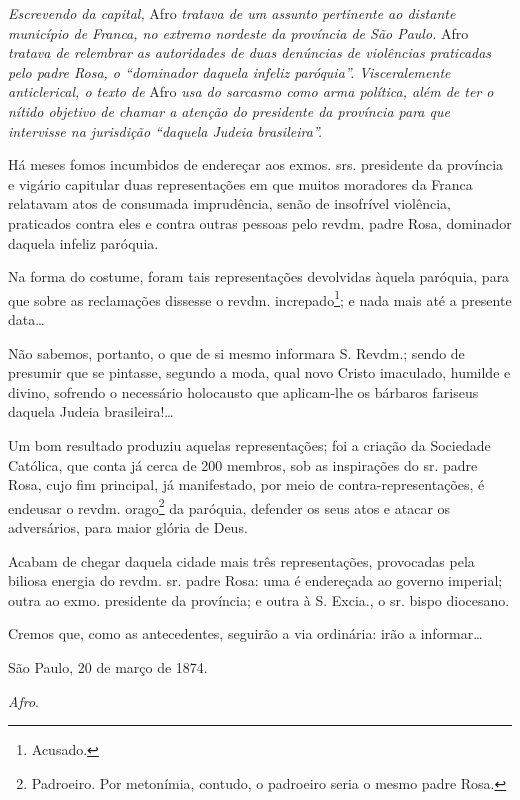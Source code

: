 \begin{didascalia}
\emph{Escrevendo da capital,} Afro \emph{tratava de um assunto
pertinente ao distante município de Franca, no extremo nordeste da
província de São Paulo.} Afro \emph{tratava de relembrar as autoridades
de duas denúncias de violências praticadas pelo padre Rosa, o ``dominador
daquela infeliz paróquia''. Visceralemente anticlerical, o texto de} Afro
\emph{usa do sarcasmo como arma política, além de ter o nítido objetivo
de chamar a atenção do presidente da província para que intervisse na
jurisdição ``daquela Judeia brasileira''.}
\end{didascalia}

Há meses fomos incumbidos de endereçar aos exmos. srs. presidente da
província e vigário capitular duas representações em que muitos
moradores da Franca relatavam atos de consumada imprudência, senão de
insofrível violência, praticados contra eles e contra outras pessoas
pelo revdm. padre Rosa, dominador daquela infeliz paróquia.

Na forma do costume, foram tais representações devolvidas àquela
paróquia, para que sobre as reclamações dissesse o revdm.
increpado\footnote{ Acusado.}; e nada mais até a presente data\ldots{}

Não sabemos, portanto, o que de si mesmo informara S. Revdm.; sendo de
presumir que se pintasse, segundo a moda, qual novo Cristo imaculado,
humilde e divino, sofrendo o necessário holocausto que aplicam-lhe os
bárbaros fariseus daquela Judeia brasileira!\ldots{}

Um bom resultado produziu aquelas representações; foi a criação da
Sociedade Católica, que conta já cerca de 200 membros, sob as
inspirações do sr. padre Rosa, cujo fim principal, já manifestado, por
meio de contra-representações, é endeusar o revdm. orago\footnote{
  Padroeiro. Por metonímia, contudo, o padroeiro seria o mesmo padre
  Rosa.} da paróquia, defender os seus atos e atacar os adversários,
para maior glória de Deus.

Acabam de chegar daquela cidade mais três representações, provocadas
pela biliosa energia do revdm. sr. padre Rosa: uma é endereçada ao
governo imperial; outra ao exmo. presidente da província; e outra à S.
Excia., o sr. bispo diocesano.

Cremos que, como as antecedentes, seguirão a via ordinária: irão a
informar\ldots{}

São Paulo, 20 de março de 1874.

\emph{Afro}.

